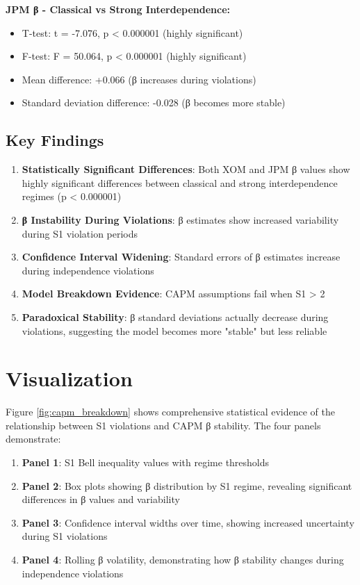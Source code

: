 \documentclass[11pt,a4paper]{article}
\begin{document}
\textbf{JPM β - Classical vs Strong Interdependence:}
\begin{itemize}
\item T-test: t = -7.076, p < 0.000001 (highly significant)
\item F-test: F = 50.064, p < 0.000001 (highly significant)
\item Mean difference: +0.066 (β increases during violations)
\item Standard deviation difference: -0.028 (β becomes more stable)
\end{itemize}

\subsection{Key Findings}

\begin{enumerate}
\item \textbf{Statistically Significant Differences}: Both XOM and JPM β values show highly significant differences between classical and strong interdependence regimes (p < 0.000001)
\item \textbf{β Instability During Violations}: β estimates show increased variability during S1 violation periods
\item \textbf{Confidence Interval Widening}: Standard errors of β estimates increase during independence violations
\item \textbf{Model Breakdown Evidence}: CAPM assumptions fail when S1 > 2
\item \textbf{Paradoxical Stability}: β standard deviations actually decrease during violations, suggesting the model becomes more "stable" but less reliable
\end{enumerate}

\section{Visualization}

Figure \ref{fig:capm_breakdown} shows comprehensive statistical evidence of the relationship between S1 violations and CAPM β stability. The four panels demonstrate:

\begin{enumerate}
\item \textbf{Panel 1}: S1 Bell inequality values with regime thresholds
\item \textbf{Panel 2}: Box plots showing β distribution by S1 regime, revealing significant differences in β values and variability
\item \textbf{Panel 3}: Confidence interval widths over time, showing increased uncertainty during S1 violations
\item \textbf{Panel 4}: Rolling β volatility, demonstrating how β stability changes during independence violations
\end{enumerate}
\end{document}

